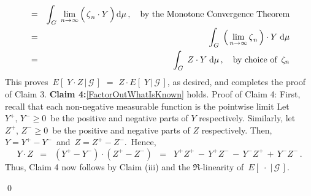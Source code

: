 \begin{enumerate}
\begin{eqnarray*}
	\\
	&=&
		\int_{G}\;
			\underset{n\rightarrow\infty}{\lim}\left(\,\overset{{\color{white}.}}{\zeta}_{n} \cdot Y\,\right)
			\d\mu
			\,,\quad\textnormal{by the Monotone Convergence Theorem}
	\\
	&=&
		\int_{G}\;
			\left(\,\underset{n\rightarrow\infty}{\lim}\,\overset{{\color{white}.}}{\zeta}_{n}\,\right) \cdot Y
			\;\d\mu
	\\
	&=&
		\int_{G}\; Z \cdot Y \;\d\mu
			\,,\quad\textnormal{by choice of \,$\zeta_{n}$}
	\end{eqnarray*}
	This proves \,$E\!\left[\;Y \cdot Z\,\vert\,\mathcal{G}\,\right]$ $=$ $Z \cdot E\!\left[\;Y\,\vert\,\mathcal{G}\,\right]$,
	as desired, and completes the proof of Claim 3.
	\vskip 0.4cm
	\textbf{Claim 4:}\;\;\eqref{FactorOutWhatIsKnown} holds.
	\vskip 0.0cm
	Proof of Claim 4: First, recall that each non-negative measurable function is the pointwise limit
	Let \,$Y^{+},\,Y^{-} \geq 0$\, be the positive and negative parts of $Y$ respectively.
	Similarly, let \,$Z^{+},\,Z^{-} \geq 0$\, be the positive and negative parts of $Z$ respectively.
	Then, \,$Y = Y^{+} - Y^{-}$\, and \,$Z = Z^{+} - Z^{-}$.\,
	Hence,
	\begin{equation*}
	Y \cdot Z
	\;\; = \;\; (Y^{+} - Y^{-}) \cdot (Z^{+} - Z^{-})
	\;\; = \;\; Y^{+}Z^{+} \,-\, Y^{+}Z^{-} \,-\, Y^{-}Z^{+} \,+\, Y^{-}Z^{-}\,.
	\end{equation*}
	Thus, Claim 4 now follows by Claim (iii) and the $\Re$-linearity of \,$E\!\left[\;\cdot\;\vert\,\mathcal{G}\,\right]$.
\end{enumerate}

\qed

